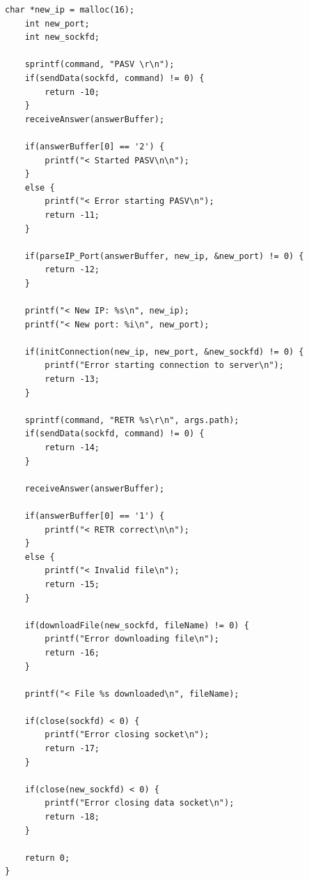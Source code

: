 \documentclass[11pt]{article}
\begin{document}
\begin{lstlisting}[style=CStyle]
    char *new_ip = malloc(16);
    int new_port;
    int new_sockfd;

    sprintf(command, "PASV \r\n");
    if(sendData(sockfd, command) != 0) {
        return -10;
    }
    receiveAnswer(answerBuffer);

    if(answerBuffer[0] == '2') {
        printf("< Started PASV\n\n");
    }
    else {
        printf("< Error starting PASV\n");
        return -11;
    }

    if(parseIP_Port(answerBuffer, new_ip, &new_port) != 0) {
        return -12;
    }

    printf("< New IP: %s\n", new_ip);
    printf("< New port: %i\n", new_port);

    if(initConnection(new_ip, new_port, &new_sockfd) != 0) {
        printf("Error starting connection to server\n");
        return -13;
    }

    sprintf(command, "RETR %s\r\n", args.path);
    if(sendData(sockfd, command) != 0) {
        return -14;
    }

    receiveAnswer(answerBuffer);

    if(answerBuffer[0] == '1') {
        printf("< RETR correct\n\n");
    }
    else {
        printf("< Invalid file\n");
        return -15;
    }

    if(downloadFile(new_sockfd, fileName) != 0) {
        printf("Error downloading file\n");
        return -16;
    }

    printf("< File %s downloaded\n", fileName);

    if(close(sockfd) < 0) {
        printf("Error closing socket\n");
        return -17;
    }

    if(close(new_sockfd) < 0) {
        printf("Error closing data socket\n");
        return -18;
    }

    return 0;
}

\end{lstlisting}
\end{document}
